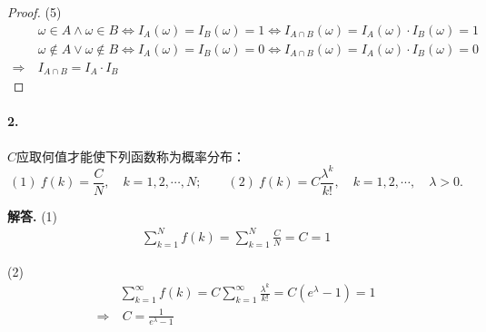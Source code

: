 \documentclass[12pt, a4paper, oneside]{ctexart}
\newenvironment{solution}{\par\noindent\textbf{解答. }}{\bigskip\par}
\begin{document}
\begin{proof}
    (5)\begin{equation*}
        \begin{aligned}
            &\ \omega\in A\land \omega\in B\iff I_A(\omega) = I_B(\omega) = 1\iff I_{A\cap B}(\omega) = I_A(\omega)\cdot I_B(\omega) = 1\\
            &\ \omega\notin A\lor \omega\notin B\iff I_A(\omega) = I_B(\omega) = 0\iff I_{A\cap B}(\omega) = I_A(\omega)\cdot I_B(\omega) = 0\\
            \Rightarrow &\ I_{A\cap B} = I_A\cdot I_B
        \end{aligned}
    \end{equation*}
\end{proof}
\paragraph{2.}$C$应取何值才能使下列函数称为概率分布：
\begin{equation*}
    (1)\ f(k) = \frac{C}{N},\quad k=1,2,\cdots,N;\quad\quad(2)\ f(k)=C\frac{\lambda^k}{k!},\quad k=1,2,\cdots,\quad \lambda > 0.
\end{equation*}
\begin{solution}
    (1) \begin{equation*}
        \begin{aligned}
            \sum_{k=1}^Nf(k) = \sum_{k=1}^N\frac{C}{N} = C = 1
        \end{aligned}
    \end{equation*}
    
    (2)\begin{equation*}
        \begin{aligned}
            &\sum_{k=1}^{\infty}f(k) = C\sum_{k=1}^{\infty}\frac{\lambda^k}{k!} = C(e^\lambda - 1) = 1\\
            \Rightarrow &\ C=  \frac{1}{e^\lambda - 1}
        \end{aligned}
    \end{equation*}
\end{solution}
\end{document}
